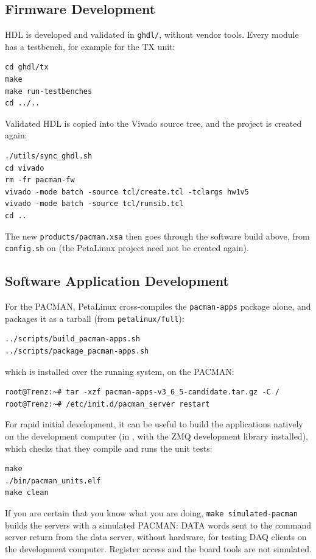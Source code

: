 \documentclass[12pt]{article}
\begin{document}
\subsection{Firmware Development}

HDL is developed and validated in \texttt{ghdl/}, without vendor tools.  Every module has a
testbench, for example for the TX unit:
\begin{lstlisting}[frame=leftline]
cd ghdl/tx
make
make run-testbenches
cd ../..
\end{lstlisting}
Validated HDL is copied into the Vivado source tree, and the project is created again:
\begin{lstlisting}[frame=leftline]
./utils/sync_ghdl.sh
cd vivado
rm -fr pacman-fw
vivado -mode batch -source tcl/create.tcl -tclargs hw1v5
vivado -mode batch -source tcl/runsib.tcl
cd ..
\end{lstlisting}
The new \texttt{products/pacman.xsa} then goes through the software build above, from
\texttt{config.sh} on (the PetaLinux project need not be created again).

\subsection{Software Application Development}

For the PACMAN, PetaLinux cross-compiles the \texttt{pacman-apps} package alone, and packages it as a
tarball (from \texttt{petalinux/full}):
\begin{lstlisting}[frame=leftline]
../scripts/build_pacman-apps.sh
../scripts/package_pacman-apps.sh
\end{lstlisting}
which is installed over the running system, on the PACMAN:
\begin{lstlisting}[frame=leftline]
root@Trenz:~# tar -xzf pacman-apps-v3_6_5-candidate.tar.gz -C /
root@Trenz:~# /etc/init.d/pacman_server restart
\end{lstlisting}

For rapid initial development, it can be useful to build the applications natively on the
development computer (in , with the ZMQ development library
installed), which checks that they compile and runs the unit tests:
\begin{lstlisting}[frame=leftline]
make
./bin/pacman_units.elf
make clean
\end{lstlisting}
If you are certain that you know what you are doing, \texttt{make simulated-pacman} builds the
servers with a simulated PACMAN: DATA words sent to the command server return from the data server,
without hardware, for testing DAQ clients on the development computer.  Register access and the
board tools are not simulated.
\end{document}
